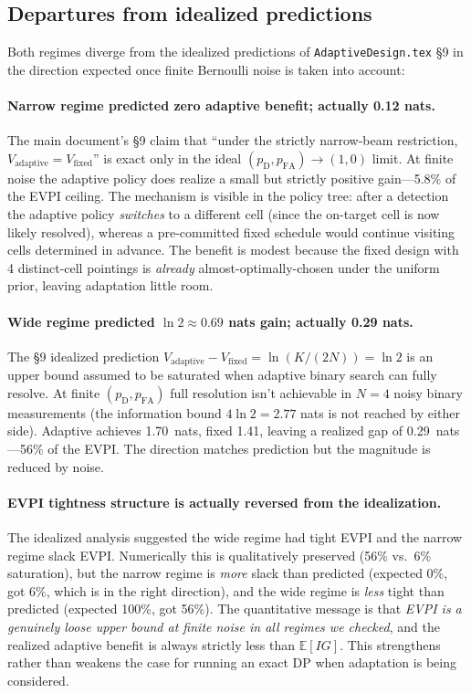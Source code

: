 \documentclass[11pt,a4paper]{article}
\newcommand{\E}{\mathbb{E}}
\begin{document}
\subsection{Departures from idealized predictions}

Both regimes diverge from the idealized predictions of \texttt{AdaptiveDesign.tex} \S9 in the direction expected once finite Bernoulli noise is taken into account:

\paragraph{Narrow regime predicted zero adaptive benefit; actually 0.12 nats.}
The main document's §9 claim that ``under the strictly narrow-beam restriction, $V_{\text{adaptive}} = V_{\text{fixed}}$'' is exact only in the ideal $(p_{\mathrm{D}}, p_{\mathrm{FA}}) \to (1, 0)$ limit.  At finite noise the adaptive policy does realize a small but strictly positive gain---5.8\% of the EVPI ceiling.  The mechanism is visible in the policy tree: after a detection the adaptive policy \emph{switches} to a different cell (since the on-target cell is now likely resolved), whereas a pre-committed fixed schedule would continue visiting cells determined in advance.  The benefit is modest because the fixed design with 4 distinct-cell pointings is \emph{already} almost-optimally-chosen under the uniform prior, leaving adaptation little room.

\paragraph{Wide regime predicted $\ln 2 \approx 0.69$ nats gain; actually 0.29 nats.}
The \S9 idealized prediction $V_{\text{adaptive}} - V_{\text{fixed}} = \ln(K/(2N)) = \ln 2$ is an upper bound assumed to be saturated when adaptive binary search can fully resolve.  At finite $(p_{\mathrm{D}}, p_{\mathrm{FA}})$ full resolution isn't achievable in $N = 4$ noisy binary measurements (the information bound $4 \ln 2 = 2.77$ nats is not reached by either side).  Adaptive achieves 1.70~nats, fixed 1.41, leaving a realized gap of 0.29~nats---56\% of the EVPI.  The direction matches prediction but the magnitude is reduced by noise.

\paragraph{EVPI tightness structure is actually reversed from the idealization.}
The idealized analysis suggested the wide regime had tight EVPI and the narrow regime slack EVPI.  Numerically this is qualitatively preserved (56\% vs.\ 6\% saturation), but the narrow regime is \emph{more} slack than predicted (expected 0\%, got 6\%, which is in the right direction), and the wide regime is \emph{less} tight than predicted (expected 100\%, got 56\%).  The quantitative message is that \emph{EVPI is a genuinely loose upper bound at finite noise in all regimes we checked}, and the realized adaptive benefit is always strictly less than $\E[IG]$.  This strengthens rather than weakens the case for running an exact DP when adaptation is being considered.
\end{document}
